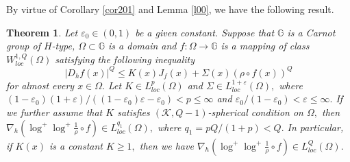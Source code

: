 \documentclass[11pt,twoside]{article}
\newtheorem{thm}{Theorem}[section]
\theoremstyle{definition}
\theoremstyle{remark}
\begin{document}
By virtue of  Corollary \ref{cor201}  and Lemma \ref{l00}, we have the following result. 
\begin{thm}\label{th11000}
Let $\varepsilon_{0}\in(0,1)$ be a given constant. Suppose that $\mathbb{G}$ is a Carnot group of $H$-type, $\Omega\subset\mathbb{G}$ is a domain and $f:\Omega\rightarrow \mathbb{G}$ is a mapping of class $W_{loc}^{1,Q}(\Omega)$ satisfying  the following inequality
$$\vert D_{h}f(x)\vert^{Q}\leq K(x)J_{f}(x)+\Sigma(x)(\rho\circ f(x))^{Q}$$
for almost every $x\in\Omega.$ Let $K\in L_{loc}^{p}(\Omega)$ and $\Sigma\in L_{loc}^{1+\varepsilon}(\Omega),$ where $(1-\varepsilon_{0})(1+\varepsilon)/((1-\varepsilon_{0})\varepsilon-\varepsilon_{0})<p\leq\infty$ and $\varepsilon_{0}/(1-\varepsilon_{0})<\varepsilon\leq\infty.$  If we further assume that $K$ satisfies $(\mathcal{K},Q-1)$-spherical  condition on $\Omega,$ then $\nabla_{h}(\log^{+}\log^{+}\frac{1}{\rho}\circ f)\in L_{loc}^{q_{1}}(\Omega),$ where $q_{1}=pQ/(1+p)<Q.$ In particular, if $K(x)$ is a constant $K\geq1 ,$ then we have $\nabla_{h}(\log^{+}\log^{+}\frac{1}{\rho}\circ f)\in L_{loc}^{Q}(\Omega).$ 
\end{thm}
\end{document}
